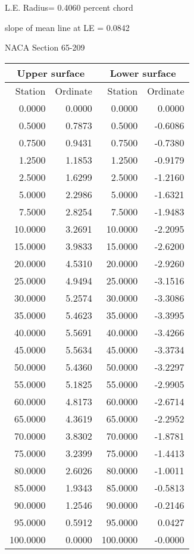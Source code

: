 \documentclass[11pt]{book}
\begin{document}
L.E. Radius=  0.4060 percent chord


 slope of mean line at LE =  0.0842
 \newpage
  \label{s65-209}
 \begin{Large}
 NACA Section 65-209
 \end{Large}
  
 \vspace{8mm}
 \begin{tabular}{|r|r|r|r|} \hline 
 \multicolumn{2}{|c|}{Upper surface} & \multicolumn{2}{|c|}{Lower surface} \\
 \hline
 Station & Ordinate & Station & Ordinate \\
 \hline
0.0000 & 0.0000 & 0.0000 & 0.0000 \\
0.5000 & 0.7873 & 0.5000 & -0.6086 \\
0.7500 & 0.9431 & 0.7500 & -0.7380 \\
1.2500 & 1.1853 & 1.2500 & -0.9179 \\
2.5000 & 1.6299 & 2.5000 & -1.2160 \\
5.0000 & 2.2986 & 5.0000 & -1.6321 \\
7.5000 & 2.8254 & 7.5000 & -1.9483 \\
10.0000 & 3.2691 & 10.0000 & -2.2095 \\
15.0000 & 3.9833 & 15.0000 & -2.6200 \\
20.0000 & 4.5310 & 20.0000 & -2.9260 \\
25.0000 & 4.9494 & 25.0000 & -3.1516 \\
30.0000 & 5.2574 & 30.0000 & -3.3086 \\
35.0000 & 5.4623 & 35.0000 & -3.3995 \\
40.0000 & 5.5691 & 40.0000 & -3.4266 \\
45.0000 & 5.5634 & 45.0000 & -3.3734 \\
50.0000 & 5.4360 & 50.0000 & -3.2297 \\
55.0000 & 5.1825 & 55.0000 & -2.9905 \\
60.0000 & 4.8173 & 60.0000 & -2.6714 \\
65.0000 & 4.3619 & 65.0000 & -2.2952 \\
70.0000 & 3.8302 & 70.0000 & -1.8781 \\
75.0000 & 3.2399 & 75.0000 & -1.4413 \\
80.0000 & 2.6026 & 80.0000 & -1.0011 \\
85.0000 & 1.9343 & 85.0000 & -0.5813 \\
90.0000 & 1.2546 & 90.0000 & -0.2146 \\
95.0000 & 0.5912 & 95.0000 & 0.0427 \\
100.0000 & 0.0000 & 100.0000 & -0.0000 \\
 \hline 
 \end{tabular}
\end{document}

